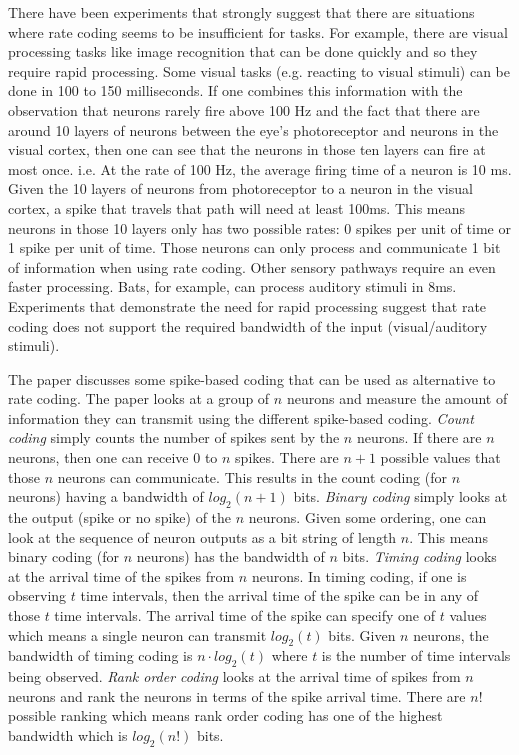 \documentclass[12pt,A4]{article}
\begin{document}
There have been experiments that strongly suggest that there are situations where rate coding seems
to be insufficient for tasks. For example, there are visual processing tasks like image recognition
that can be done quickly and so they require rapid processing. Some visual tasks (e.g. reacting to 
visual stimuli) can be done in 100 to 150 milliseconds. If one combines this information with the 
observation that neurons rarely fire above 100 Hz and the fact that there are around 10 layers of
neurons between the eye's photoreceptor and neurons in the visual cortex, then one can see that 
the neurons in those ten layers can fire at most once. i.e. At the rate of 100 Hz, the average
firing time of a neuron is 10 ms. Given the 10 layers of neurons from photoreceptor to a neuron
in the visual cortex, a spike that travels that path will need at least 100ms. This means neurons
in those 10 layers only has two possible rates: 0 spikes per unit of time or 1 spike per unit of 
time. Those neurons can only process and communicate 1 bit of information when using rate coding.
Other sensory pathways require an even faster processing. Bats, for example, can process auditory 
stimuli in 8ms. Experiments that demonstrate the need for rapid processing  suggest that rate coding 
does not support the required bandwidth of the input (visual/auditory stimuli).

The paper \cite{thorpe-2001-spike} discusses some spike-based coding that can be used as alternative
to rate coding. The paper looks at a group of $n$ neurons and measure the amount of information they
can transmit using the different spike-based coding. \emph{Count coding} simply counts the number
of spikes sent by the $n$ neurons. If there are $n$ neurons, then one can receive $0$ to $n$ spikes.
There are $n+1$ possible values that those $n$ neurons can communicate. This results in the count 
coding (for $n$ neurons) having a bandwidth of $log_2(n+1)$ bits. \emph{Binary coding} simply looks
at the output (spike or no spike) of the $n$ neurons. Given some ordering, one can look at the
sequence of neuron outputs as a bit string of length $n$. This means binary coding (for $n$ 
neurons) has the bandwidth of $n$ bits. \emph{Timing coding} looks at the arrival time of the 
spikes from $n$ neurons. In timing coding, if one is observing $t$ time intervals, then the arrival
time of the spike can be in any of those $t$ time intervals. The arrival time of the spike can
specify one of $t$ values which means a single neuron can transmit $log_2(t)$ bits. Given $n$ 
neurons, the bandwidth of timing coding is $n \cdot log_2(t)$ where $t$ is the number of time 
intervals being observed. \emph{Rank order coding} looks at the arrival time of spikes from $n$
neurons and rank the neurons in terms of the spike arrival time. There are $n!$ possible ranking
which means rank order coding has one of the highest bandwidth which is $log_2(n!)$ bits.
\end{document}
